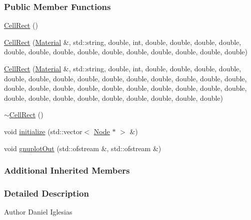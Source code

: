 \subsubsection*{Public Member Functions}
\begin{DoxyCompactItemize}
\item 
\hyperlink{classmknix_1_1_cell_rect_a7cc280eb130683f2b8d77ce04d3f7e84}{Cell\-Rect} ()
\item 
\hyperlink{classmknix_1_1_cell_rect_a5242df2938d1f9f60cd089c5309fa1c2}{Cell\-Rect} (\hyperlink{classmknix_1_1_material}{Material} \&, std\-::string, double, int, double, double, double, double, double, double, double, double, double, double, double, double, double, double)
\item 
\hyperlink{classmknix_1_1_cell_rect_a16a49a17652e7941217e1089bb243a6f}{Cell\-Rect} (\hyperlink{classmknix_1_1_material}{Material} \&, std\-::string, double, int, double, double, double, double, double, double, double, double, double, double, double, double, double, double, double, double, double, double, double, double, double, double, double, double, double, double, double, double, double, double, double, double, double)
\item 
\hyperlink{classmknix_1_1_cell_rect_a966a8afa0dee4990f8231cb7e32d33ee}{$\sim$\-Cell\-Rect} ()
\item 
void \hyperlink{classmknix_1_1_cell_rect_a599daac72085b935a90afe8ffcecdd20}{initialize} (std\-::vector$<$ \hyperlink{classmknix_1_1_node}{Node} $\ast$ $>$ \&)
\item 
void \hyperlink{classmknix_1_1_cell_rect_aff6050da82b250a264f856743b0225e0}{gnuplot\-Out} (std\-::ofstream \&, std\-::ofstream \&)
\end{DoxyCompactItemize}
\subsubsection*{Additional Inherited Members}


\subsubsection{Detailed Description}
\begin{DoxyAuthor}{Author}
Daniel Iglesias 
\end{DoxyAuthor}


